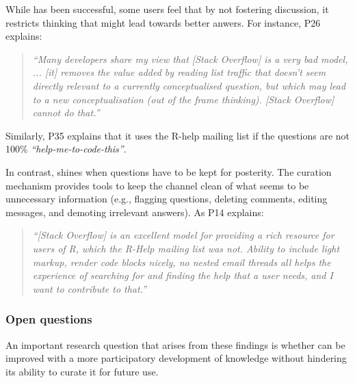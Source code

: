 While \SO  has been successful, some users feel that by not fostering discussion, it restricts thinking that might lead towards better anwers. 
For instance, P26 explains:
    \begin{quote}
        \textit{``Many developers share my view that [Stack Overflow] is a very bad model, ... [it] removes the value added by reading list traffic that doesn't seem directly relevant to a currently conceptualised question, but which may lead to a new conceptualisation (out of the frame thinking). [Stack Overflow] cannot do that.''}
    \end{quote}
    Similarly, P35 explains that it uses the R-help mailing list if the questions are not 100\% \textit{``help-me-to-code-this''}.

    In contrast, \SO shines when questions have to be kept for posterity. 
    The curation mechanism provides tools to keep the channel clean of what seems to be unnecessary information (e.g., flagging questions, deleting comments, editing messages, and demoting irrelevant answers). As P14 explains:

    \begin{quote}
        \textit{``[Stack Overflow] is an excellent model for providing a rich resource for users of R, which the R-Help mailing list was not. 
        Ability to include light markup, render code blocks nicely, no nested email threads all helps the experience of searching for and finding the help that a user needs, and I want to contribute to that.''}
    \end{quote}


\subsubsection{Open questions}

An important research question that arises from these findings is whether \SO can be improved with a more participatory development of knowledge without
hindering its ability to curate it for future use.

